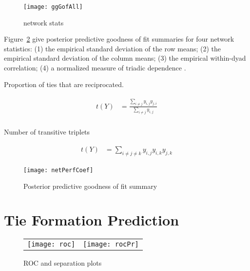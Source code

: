 \begin{figure}[ht]
	\centering
	\texttt{[image: ggGofAll]}
	\caption{network stats }
	\label{fig:gofAll}
\end{figure}

Figure~\ref{fig:ergmAmePerf} give posterior predictive goodness of fit summaries for four network statistics: (1) the empirical standard deviation of the row means; (2) the empirical standard deviation of the column means; (3) the empirical within-dyad correlation; (4) a normalized measure of triadic dependence \citep{hoff:etal:2015}. 

Proportion of ties that are reciprocated. 

\begin{align}
\begin{aligned}
t(Y) &= \frac{ \sum_{i \neq j}y_{i,j} y_{j,i} }{ \sum_{i \neq j} y_{i,j} } \\
\end{aligned}
\end{align}

Number of transitive triplets

\begin{align}
\begin{aligned}
t(Y) &= \sum_{i \neq j \neq k} y_{i,j} y_{i,k} y_{j,k}
\end{aligned}
\end{align}

\begin{figure}[ht]
	\centering
	\texttt{[image: netPerfCoef]}
	\caption{Posterior predictive goodness of fit summary}
	\label{fig:ergmAmePerf}
\end{figure}

\section{Tie Formation Prediction}

\begin{figure}[ht]
	\centering
	\begin{tabular}{cc}
	\texttt{[image: roc]} & 
	\texttt{[image: rocPr]}	
	\end{tabular}
	\caption{ROC and separation plots}
	\label{fig:roc}
\end{figure}

% 
